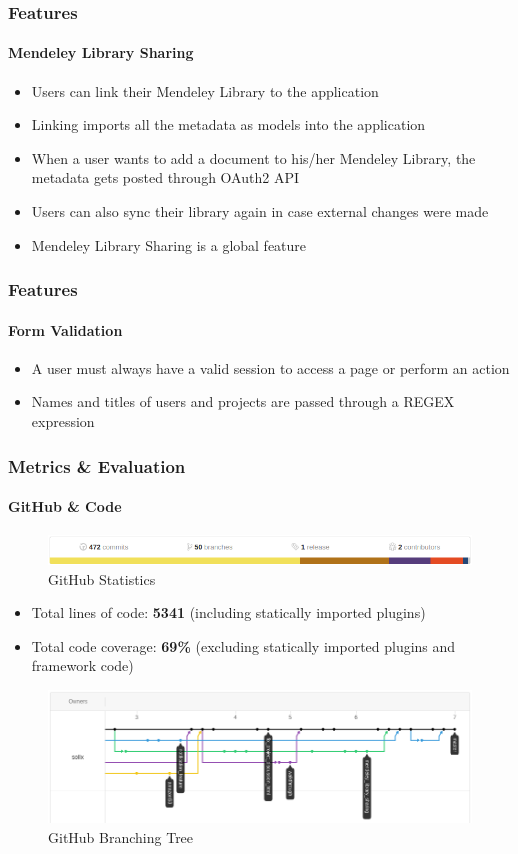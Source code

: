 \documentclass{beamer}
\begin{document}
\begin{frame}
\frametitle{Features}
\framesubtitle{Mendeley Library Sharing}
	\begin{itemize}
		\item Users can link their Mendeley Library to the application
		\item Linking imports all the metadata as models into the application
		\item When a user wants to add a document to his/her Mendeley Library, the metadata gets posted through OAuth2 API
		\item Users can also sync their library again in case external changes were made
		\item Mendeley Library Sharing is a global feature
	\end{itemize}
\end{frame}

\begin{frame}
\frametitle{Features}
\framesubtitle{Form Validation}
	\begin{itemize}
		\item A user must always have a valid session to access a page or perform an action
		\item Names and titles of users and projects are passed through a REGEX expression
	\end{itemize}
\end{frame}

\begin{frame}
\frametitle{Metrics \& Evaluation}
\framesubtitle{GitHub \& Code}
	\begin{figure}
		\includegraphics[scale=0.3]{./images/github_stats.png}
		\caption{GitHub Statistics}
	\end{figure}
	\begin{itemize}
		\item Total lines of code: \textbf{5341} (including statically imported plugins)
		\item Total code coverage: \textbf{69\%} (excluding statically imported plugins and framework code)
	\end{itemize}
	\begin{figure}
		\includegraphics[scale=0.2]{./images/github_tree.png}
		\caption{GitHub Branching Tree}
	\end{figure}
\end{frame}
\end{document}
